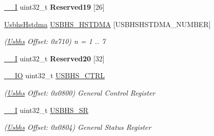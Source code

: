 \begin{DoxyCompactItemize}
\mbox{\label{structUsbhs_a76ab818f33ca6d3f98d037a0a9d8433a}} 
\mbox{\hyperlink{core__cm7_8h_af63697ed9952cc71e1225efe205f6cd3}{\+\_\+\+\_\+I}} uint32\+\_\+t {\bfseries Reserved19} \mbox{[}26\mbox{]}
\item 
\mbox{\label{structUsbhs_aba55b3391b0d7dd6dde5b8532dfab1ca}} 
\mbox{\hyperlink{structUsbhsHstdma}{Usbhs\+Hstdma}} \mbox{\hyperlink{structUsbhs_aba55b3391b0d7dd6dde5b8532dfab1ca}{U\+S\+B\+H\+S\+\_\+\+H\+S\+T\+D\+MA}} \mbox{[}U\+S\+B\+H\+S\+H\+S\+T\+D\+M\+A\+\_\+\+N\+U\+M\+B\+ER\mbox{]}
\begin{DoxyCompactList}\small\item\em (\mbox{\hyperlink{structUsbhs}{Usbhs}} Offset\+: 0x710) n = 1 .. 7 \end{DoxyCompactList}\item 
\mbox{\label{structUsbhs_a74da5fe869ccb364c60e1aa4e4b7f0da}} 
\mbox{\hyperlink{core__cm7_8h_af63697ed9952cc71e1225efe205f6cd3}{\+\_\+\+\_\+I}} uint32\+\_\+t {\bfseries Reserved20} \mbox{[}32\mbox{]}
\item 
\mbox{\label{structUsbhs_aa4bbd1ab838748bc3ba6a1dd2dfce39f}} 
\mbox{\hyperlink{core__cm7_8h_aec43007d9998a0a0e01faede4133d6be}{\+\_\+\+\_\+\+IO}} uint32\+\_\+t \mbox{\hyperlink{structUsbhs_aa4bbd1ab838748bc3ba6a1dd2dfce39f}{U\+S\+B\+H\+S\+\_\+\+C\+T\+RL}}
\begin{DoxyCompactList}\small\item\em (\mbox{\hyperlink{structUsbhs}{Usbhs}} Offset\+: 0x0800) General Control Register \end{DoxyCompactList}\item 
\mbox{\label{structUsbhs_a5b314db9bb585106401fec9b36cb4723}} 
\mbox{\hyperlink{core__cm7_8h_af63697ed9952cc71e1225efe205f6cd3}{\+\_\+\+\_\+I}} uint32\+\_\+t \mbox{\hyperlink{structUsbhs_a5b314db9bb585106401fec9b36cb4723}{U\+S\+B\+H\+S\+\_\+\+SR}}
\begin{DoxyCompactList}\small\item\em (\mbox{\hyperlink{structUsbhs}{Usbhs}} Offset\+: 0x0804) General Status Register \end{DoxyCompactList}\item 
\mbox{\label{structUsbhs_a6e14557f921b5fb2c6a27e7aba536065}} 

\end{DoxyCompactItemize}

